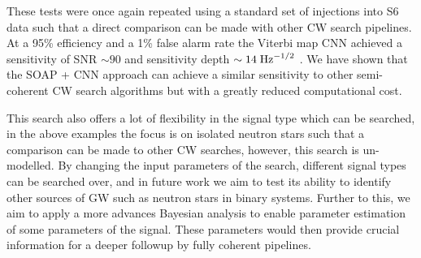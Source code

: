 %
These tests were once again repeated using a standard set of injections into S6
data such that a direct comparison can be made with other \gls{CW} search
pipelines. At a 95\% efficiency and a 1\% false alarm rate the Viterbi map
\gls{CNN} achieved a sensitivity of \gls{SNR} $ \sim 90$ and sensitivity depth
$\sim 14 \; \rm{Hz}^{-1/2}$ . We have shown that the SOAP + \gls{CNN} approach
can achieve a similar sensitivity to other semi-coherent \gls{CW} search
algorithms but with a greatly reduced computational cost.

%
This search also offers a lot of flexibility in the signal type which can be
searched, in the above examples the focus is on isolated neutron stars such
that a comparison can be made to other \gls{CW} searches, however, this search
is un-modelled. By changing the input parameters of the search, different
signal types can be searched over, and in future work we aim to test its
ability to identify other sources of \gls{GW} such as neutron stars in binary systems.
Further to this, we aim to apply a more advances Bayesian analysis to enable parameter estimation of some parameters of the signal.
These parameters would then provide crucial information for a deeper followup by fully coherent pipelines. 





